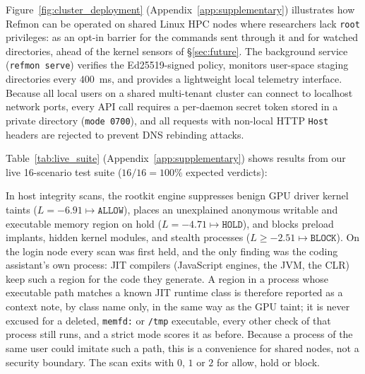 \documentclass[10pt,twocolumn,letterpaper]{article}
\makeatletter
\theoremstyle{plain}
\theoremstyle{definition}
\theoremstyle{remark}
\DeclareRobustCommand{\_}{\ifmmode\nfss@text{\textunderscore}\else\textunderscore\penalty\@highpenalty\hskip\z@skip\fi}
\makeatother
\begin{document}
Figure~\ref{fig:cluster_deployment} (Appendix~\ref{app:supplementary}) illustrates how Refmon can be operated on shared Linux HPC nodes where researchers lack \texttt{root} privileges: as an opt-in barrier for the commands sent through it and for watched directories, ahead of the kernel sensors of \S\ref{sec:future}. The background service (\texttt{refmon serve}) verifies the Ed25519-signed policy, monitors user-space staging directories every $400$~ms, and provides a lightweight local telemetry interface. Because all local users on a shared multi-tenant cluster can connect to localhost network ports, every API call requires a per-daemon secret token stored in a private directory (\texttt{mode 0700}), and all requests with non-local HTTP \texttt{Host} headers are rejected to prevent DNS rebinding attacks.

Table~\ref{tab:live_suite} (Appendix~\ref{app:supplementary}) shows results from our live 16-scenario test suite ($16/16 = 100\%$ expected verdicts):
In host integrity scans, the rootkit engine suppresses benign GPU driver kernel taints ($L = -6.91 \mapsto \texttt{ALLOW}$), places an unexplained anonymous writable and executable memory region on hold ($L = -4.71 \mapsto \texttt{HOLD}$), and blocks preload implants, hidden kernel modules, and stealth processes ($L \ge -2.51 \mapsto \texttt{BLOCK}$). On the login node every scan was first held, and the only finding was the coding assistant's own process: JIT compilers (JavaScript engines, the JVM, the CLR) keep such a region for the code they generate. A region in a process whose executable path matches a known JIT runtime class is therefore reported as a context note, by class name only, in the same way as the GPU taint; it is never excused for a deleted, \texttt{memfd:} or \texttt{/tmp} executable, every other check of that process still runs, and a strict mode scores it as before. Because a process of the same user could imitate such a path, this is a convenience for shared nodes, not a security boundary. The scan exits with $0$, $1$ or $2$ for allow, hold or block.
\end{document}
